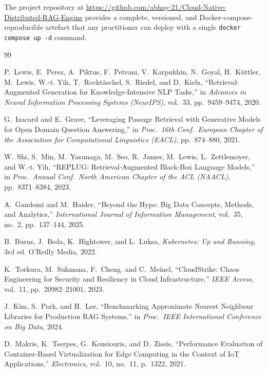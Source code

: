 \documentclass[12pt,a4paper]{report}
\begin{document}
The project repository at \href{https://github.com/abhay-21/Cloud-Native-Distributed-RAG-Engine}{https://github.com/abhay-21/Cloud-Native-Distributed-RAG-Engine}
provides a complete, versioned, and Docker-compose-reproducible artefact
that any practitioner can deploy with a single \texttt{docker compose up -d}
command.
\newpage


\begin{thebibliography}{99}

  P.~Lewis, E.~Perez, A.~Piktus, F.~Petroni, V.~Karpukhin, N.~Goyal,
  H.~K{\"u}ttler, M.~Lewis, W.-t. Yih, T.~Rockt{\"a}schel, S.~Riedel,
  and D.~Kiela,
  ``Retrieval-Augmented Generation for Knowledge-Intensive NLP Tasks,''
  in \textit{Advances in Neural Information Processing Systems (NeurIPS)},
  vol.~33, pp.~9459--9474, 2020.

  G.~Izacard and E.~Grave,
  ``Leveraging Passage Retrieval with Generative Models for Open Domain
  Question Answering,''
  in \textit{Proc.\ 16th Conf.\ European Chapter of the Association for
  Computational Linguistics (EACL)}, pp.~874--880, 2021.

  W.~Shi, S.~Min, M.~Yasunaga, M.~Seo, R.~James, M.~Lewis, L.~Zettlemoyer,
  and W.-t. Yih,
  ``REPLUG: Retrieval-Augmented Black-Box Language Models,''
  in \textit{Proc.\ Annual Conf.\ North American Chapter of the ACL
  (NAACL)}, pp.~8371--8384, 2023.

  A.~Gandomi and M.~Haider,
  ``Beyond the Hype: Big Data Concepts, Methods, and Analytics,''
  \textit{International Journal of Information Management}, vol.~35, no.~2,
  pp.~137--144, 2025.

  B.~Burns, J.~Beda, K.~Hightower, and L.~Luksa,
  \textit{Kubernetes: Up and Running}, 3rd ed.
  O'Reilly Media, 2022.

  K.~Torkura, M.~Sukmana, F.~Cheng, and C.~Meinel,
  ``CloudStrike: Chaos Engineering for Security and Resiliency in Cloud
  Infrastructure,''
  \textit{IEEE Access}, vol.~11, pp.~20982--21001, 2023.

  J.~Kim, S.~Park, and H.~Lee,
  ``Benchmarking Approximate Nearest Neighbour Libraries for Production
  RAG Systems,''
  in \textit{Proc.\ IEEE International Conference on Big Data}, 2024.

  D.~Makris, K.~Tserpes, G.~Kousiouris, and D.~Zissis,
  ``Performance Evaluation of Container-Based Virtualization for
  Edge Computing in the Context of IoT Applications,''
  \textit{Electronics}, vol.~10, no.~11, p.~1322, 2021.


\end{thebibliography}
\end{document}
